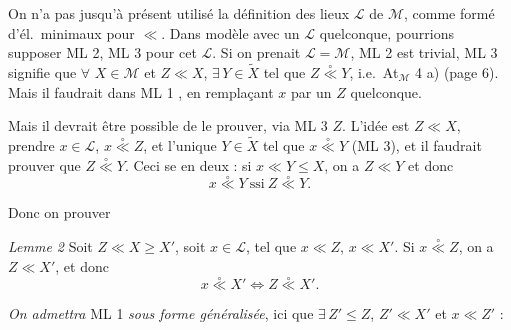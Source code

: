 \documentclass[11pt,a4paper]{article}
\begin{document}

On n'a pas jusqu'à présent utilisé la définition des lieux $\mathcal{L}$ de $\mathcal{M}$, comme formé d'él.\ minimaux pour $\ll$. Dans  modèle avec un $\mathcal{L}$ quelconque, pourrions \ill{} supposer ML 2, ML 3 pour cet $\mathcal{L}$. Si on prenait $\mathcal{L} = \mathcal{M}$, ML 2 est trivial, ML 3 signifie que $\forall$ \struck{\ill{}} $X \in \mathcal{M}$ et $Z \ll X$, $\exists\, Y \in \widetilde{X}$ tel que $Z \mathrel{\overset{\circ}{\ll}} Y$, i.e.\ At$_{\mathcal{M}}$ 4 a) (page 6). Mais il faudrait dans ML 1 \struck{\ill{}} , en remplaçant $x$ par un $Z$  quelconque.

Mais il devrait être possible de le prouver, via ML 3   $Z$. L'idée est \struck{\ill{}}  $Z \ll X$,  prendre $x \in \mathcal{L}$, $x \mathrel{\overset{\circ}{\ll}} Z$, et l'unique $Y \in \widetilde{X}$ tel que $x \mathrel{\overset{\circ}{\ll}} Y$ (ML 3), et il  faudrait prouver que $Z \mathrel{\overset{\circ}{\ll}} Y$. Ceci se  en deux : si $x \ll Y \leq X$, on a $Z \ll Y$ et donc
\[
  x \mathrel{\overset{\circ}{\ll}} Y \ \text{ssi}\ Z \mathrel{\overset{\circ}{\ll}} Y .
\]

Donc on \ill{} prouver

\emph{Lemme 2} Soit $Z \ll X \geq X'$, soit $x \in \mathcal{L}$, tel que $x \ll Z$, $x \ll X'$. Si $x \mathrel{\overset{\circ}{\ll}} Z$, on a $Z \ll X'$, et donc
\[
  x \mathrel{\overset{\circ}{\ll}} X' \iff Z \mathrel{\overset{\circ}{\ll}} X' .
\]

\emph{On admettra} ML 1 \emph{sous forme généralisée}, \ill{} ici que $\exists\, Z' \leq Z$,  $Z' \ll X'$ et $x \ll Z'$ :

\end{document}
